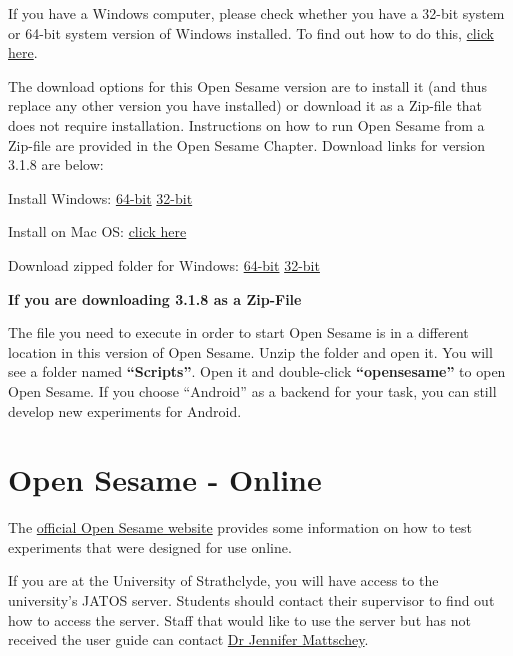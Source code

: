 \documentclass[
]{book}
\begin{document}
If you have a Windows computer, please check whether you have a 32-bit system or 64-bit system version of Windows installed. To find out how to do this, \href{https://www.howtogeek.com/howto/21726/how-do-i-know-if-im-running-32-bit-or-64-bit-windows-answers/}{click here}.

The download options for this Open Sesame version are to install it (and thus replace any other version you have installed) or download it as a Zip-file that does not require installation. Instructions on how to run Open Sesame from a Zip-file are provided in the Open Sesame Chapter. Download links for version 3.1.8 are below:

Install Windows:
\href{https://github.com/smathot/OpenSesame/releases/download/release\%2F3.1.8/opensesame_3.1.8-py3.5-win64-1.exe}{64-bit}
\href{https://github.com/smathot/OpenSesame/releases/download/release\%2F3.1.8/opensesame_3.1.8-py2.7-win32-1.exe}{32-bit}

Install on Mac OS: \href{https://github.com/smathot/OpenSesame/releases/download/release\%2F3.1.8/opensesame_3.1.8-py2.7-macos-1.dmg}{click here}

Download zipped folder for Windows:
\href{https://github.com/smathot/OpenSesame/releases/download/release\%2F3.1.8/opensesame_3.1.8-py3.5-win64-1.zip}{64-bit}
\href{https://github.com/smathot/OpenSesame/releases/download/release\%2F3.1.8/opensesame_3.1.8-py2.7-win32-1.zip}{32-bit}

\textbf{If you are downloading 3.1.8 as a Zip-File}

The file you need to execute in order to start Open Sesame is in a different location in this version of Open Sesame. Unzip the folder and open it. You will see a folder named \textbf{``Scripts''}. Open it and double-click \textbf{``opensesame''} to open Open Sesame. If you choose ``Android'' as a backend for your task, you can still develop new experiments for Android.

\hypertarget{open-sesame---online}{%
\chapter{Open Sesame - Online}\label{open-sesame---online}}

The \href{https://osdoc.cogsci.nl/3.2/manual/osweb/}{official Open Sesame website} provides some information on how to test experiments that were designed for use online.

If you are at the University of Strathclyde, you will have access to the university's JATOS server. Students should contact their supervisor to find out how to access the server. Staff that would like to use the server but has not received the user guide can contact \href{jennifer.mattschey@strath.ac.uk}{Dr Jennifer Mattschey}.
\end{document}

